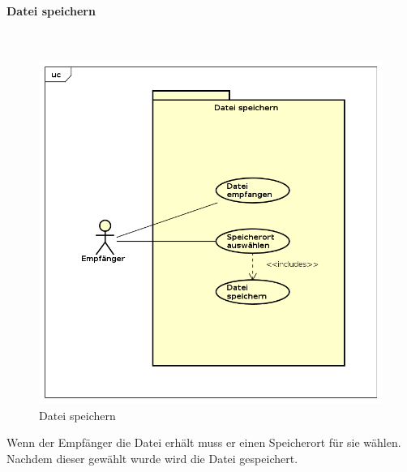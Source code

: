 \paragraph{Datei speichern}\mbox{}\\
\begin{figure}[H]
	\centering
	\includegraphics[width= 0.9\linewidth]{diagramms/useCase/datei_speichern.png}
	\caption{Datei speichern}
\end{figure}
Wenn der Empfänger die Datei erhält muss er einen Speicherort für sie wählen. Nachdem dieser gewählt wurde wird die Datei gespeichert.
